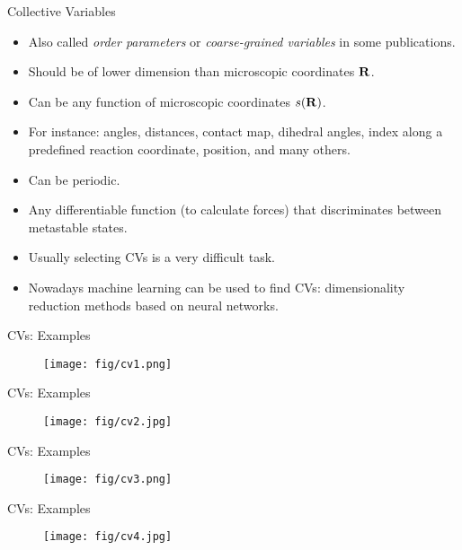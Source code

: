 \documentclass[10pt]{beamer}
\begin{document}
\begin{frame}{Collective Variables}
  \begin{itemize}
  \setlength\itemsep{1em}
    \item Also called \textit{order parameters} or \textit{coarse-grained variables} in some publications.
    \item Should be of lower dimension than microscopic coordinates ${\bf R}$.
    \item Can be any function of microscopic coordinates $s({\bf R})$.
    \item For instance: angles, distances, contact map, dihedral angles, index along a predefined reaction coordinate, position, and many others.
    \item Can be periodic.
    \item Any differentiable function (to calculate forces) that discriminates between metastable states.
    \item Usually selecting CVs is a very difficult task.
    \item Nowadays machine learning can be used to find CVs: dimensionality reduction methods based on neural networks.
  \end{itemize}
\end{frame}

\begin{frame}{CVs: Examples}
  \begin{figure}
    \texttt{[image: fig/cv1.png]}
  \end{figure}
\end{frame}

\begin{frame}{CVs: Examples}
  \begin{figure}
    \texttt{[image: fig/cv2.jpg]}
  \end{figure}
\end{frame}

\begin{frame}{CVs: Examples}
  \begin{figure}
    \texttt{[image: fig/cv3.png]}
  \end{figure}
\end{frame}

\begin{frame}{CVs: Examples}
  \begin{figure}
    \texttt{[image: fig/cv4.jpg]}
  \end{figure}
\end{frame}
\end{document}
